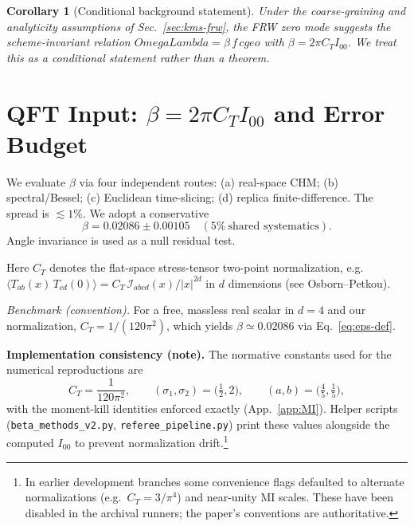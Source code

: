 \documentclass[aps,prd,onecolumn,superscriptaddress,nofootinbib]{revtex4-2}
\def\OmL{OmegaLambda}%
\def\cgeo{cgeo}%
\def\Omega_\Lambda{OmegaLambda}%
\providecommand{\OmL}{\Omega_\Lambda}
\providecommand{\cgeo}{c_{\rm geo}}
\providecommand{\be}{\begin{equation}}
\providecommand{\ee}{\end{equation}}
\newtheorem{corollary}{Corollary}
\begin{document}
\begin{corollary}[Conditional background statement]\label{cor:background-cond}
Under the coarse-graining and analyticity assumptions of Sec.~\ref{sec:kms-frw}, the FRW zero mode \emph{suggests} the scheme-invariant relation
\(\OmL=\beta\,f\,\cgeo\) with \(\beta=2\pi C_T I_{00}\). We treat this as a conditional statement rather than a theorem.
\end{corollary}

\section{QFT Input: \texorpdfstring{$\beta=2\pi C_T I_{00}$}{beta} and Error Budget}
\label{sec:beta}
We evaluate \(\beta\) via four independent routes: (a) real-space CHM; (b) spectral/Bessel; (c) Euclidean time-slicing; (d) replica finite-difference. The spread is \(\lesssim 1\%\). We adopt a conservative
\be
\beta=0.02086\pm 0.00105 \quad (5\%~\text{shared systematics}).
\ee
Angle invariance is used as a null residual test.

\noindent Here \(C_T\) denotes the flat-space stress-tensor two-point normalization, e.g.
\(\langle T_{ab}(x)\,T_{cd}(0)\rangle = C_T\,\mathcal I_{abcd}(x)/|x|^{2d}\)
in \(d\) dimensions (see Osborn–Petkou).

\noindent\emph{Benchmark (convention).} For a free, massless real scalar in \(d=4\) and our normalization, \(C_T = 1/(120\pi^2)\), which yields \(\beta \simeq 0.02086\) via Eq.~\eqref{eq:eps-def}.

\noindent\textbf{Implementation consistency (note).} The normative constants used for the numerical reproductions are
\[
C_T=\frac{1}{120\pi^2},\qquad (\sigma_1,\sigma_2)=\Big(\tfrac{1}{2},2\Big),\qquad (a,b)=\Big(\tfrac{4}{5},\tfrac{1}{5}\Big),
\]
with the moment-kill identities enforced exactly (App.~\ref{app:MI}). Helper scripts (\texttt{beta\_methods\_v2.py}, \texttt{referee\_pipeline.py}) print these values alongside the computed \(I_{00}\) to prevent normalization drift.\footnote{In earlier development branches some convenience flags defaulted to alternate normalizations (e.g.\ \(C_T=3/\pi^4\)) and near-unity MI scales. These have been disabled in the archival runners; the paper’s conventions are authoritative.}
\end{document}
